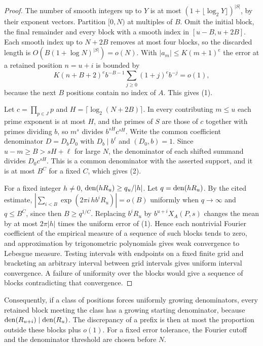 \documentclass[11pt]{article}
\begin{document}
\begin{proof}
The number of smooth integers up to $Y$ is at most $(1+\lfloor\log_2Y\rfloor)^{|S|}$, by their exponent vectors. Partition $[0,N)$ at multiples of $B$. Omit the initial block, the final remainder and every block with a smooth index in $[u-B,u+2B]$. Each smooth index up to $N+2B$ removes at most four blocks, so the discarded length is $O(B(1+\log N)^{|S|})=o(N)$. With $|a_m|\le K(m+1)^e$ the error at a retained position $n=u+i$ is bounded by
\[
 K(n+B+2)^eb^{-B-1}\sum_{j\ge0}(1+j)^eb^{-j}=o(1),
\]
because the next $B$ positions contain no index of $A$. This gives (1).

Let $c=\prod_{p\in J}p$ and $H=\lceil\log_2(N+2B)\rceil$. In every contributing $m\le u$ each prime exponent is at most $H$, and the primes of $S$ are those of $c$ together with primes dividing $b$, so $m^s$ divides $b^{sH}c^{sH}$. Write the common coefficient denominator $D=D_bD_0$ with $D_b\mid b^\ell$ and $(D_0,b)=1$. Since $u-m\ge B>sH+\ell$ for large $N$, the denominator of each shifted summand divides $D_0c^{sH}$. This is a common denominator with the asserted support, and it is at most $B^C$ for a fixed $C$, which gives (2).

For a fixed integer $h\ne0$, $\operatorname{den}(hR_u)\ge q_u/|h|$. Let $q=\operatorname{den}(hR_u)$. By the cited estimate, $|\sum_{i<B}\exp(2\pi i\,hb^iR_u)|=o(B)$ uniformly when $q\to\infty$ and $q\le B^C$, since then $B\ge q^{1/C}$. Replacing $b^iR_u$ by $b^{u+i}X_A(P,s)$ changes the mean by at most $2\pi|h|$ times the uniform error of (1). Hence each nontrivial Fourier coefficient of the empirical measure of a sequence of such blocks tends to zero, and approximation by trigonometric polynomials gives weak convergence to Lebesgue measure. Testing intervals with endpoints on a fixed finite grid and bracketing an arbitrary interval between grid intervals gives uniform interval convergence. A failure of uniformity over the blocks would give a sequence of blocks contradicting that convergence.
\end{proof}

Consequently, if a class of positions forces uniformly growing denominators, every retained block meeting the class has a growing starting denominator, because $\operatorname{den}(R_{u+i})\mid\operatorname{den}(R_u)$. The discrepancy of a prefix is then at most the proportion outside these blocks plus $o(1)$. For a fixed error tolerance, the Fourier cutoff and the denominator threshold are chosen before $N$.
\end{document}
